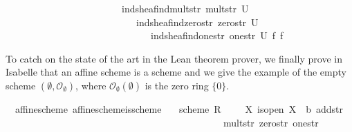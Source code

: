 \documentclass[12pt]{scrartcl}
\begin{document}
\begin{isabelle}
\ \ \ \ \ \ \ \ \ \ \ \ \ \ \ \ \ \ \ \ \ \ \ \ {\isacharparenleft}{\kern0pt}ind{\isacharunderscore}{\kern0pt}sheaf{\isachardot}{\kern0pt}ind{\isacharunderscore}{\kern0pt}mult{\isacharunderscore}{\kern0pt}str\ mult{\isacharunderscore}{\kern0pt}str\ U{\isacharparenright}{\kern0pt}\isanewline
\ \ \ \ \ \ \ \ \ \ \ \ \ \ \ \ \ \ \ \ \ \ \ \ \ \ \ {\isacharparenleft}{\kern0pt}ind{\isacharunderscore}{\kern0pt}sheaf{\isachardot}{\kern0pt}ind{\isacharunderscore}{\kern0pt}zero{\isacharunderscore}{\kern0pt}str\ zero{\isacharunderscore}{\kern0pt}str\ U{\isacharparenright}{\kern0pt}\ \isanewline
\ \ \ \ \ \ \ \ \ \ \ \ \ \ \ \ \ \ \ \ \ \ \ \ \ \ \ \ \ \ {\isacharparenleft}{\kern0pt}ind{\isacharunderscore}{\kern0pt}sheaf{\isachardot}{\kern0pt}ind{\isacharunderscore}{\kern0pt}one{\isacharunderscore}{\kern0pt}str\ one{\isacharunderscore}{\kern0pt}str\ U{\isacharparenright}{\kern0pt}\ f\ {\isasymphi}\isactrlsub f{\isacharparenright}{\kern0pt}{\isacharparenright}{\kern0pt}{\isachardoublequoteclose}
\end{isabelle}
To catch on the state of the art in the Lean theorem prover, we finally prove in Isabelle that an affine scheme is a scheme and we give the example of the empty scheme $(\emptyset, \mathscr{O}_\emptyset)$, where $\mathscr{O}_\emptyset(\emptyset)$ is the zero ring $\lbrace 0 \rbrace$. 

\begin{isabelle}
\isamarkupfalse%
\ {\isacharparenleft}{\kern0pt}\ affine{\isacharunderscore}{\kern0pt}scheme{\isacharparenright}{\kern0pt}\ affine{\isacharunderscore}{\kern0pt}scheme{\isacharunderscore}{\kern0pt}is{\isacharunderscore}{\kern0pt}scheme{\isacharcolon}{\kern0pt}\isanewline
\ \ \ {\isachardoublequoteopen}scheme\ R\ {\isacharparenleft}{\kern0pt}{\isacharplus}{\kern0pt}{\isacharparenright}{\kern0pt}\ {\isacharparenleft}{\kern0pt}{\isasymcdot}{\isacharparenright}{\kern0pt}\ {\isasymzero}\ {\isasymone}\ X\ is{\isacharunderscore}{\kern0pt}open\ {\isasymO}\isactrlsub X\ {\isasymrho}\ b\ add{\isacharunderscore}{\kern0pt}str\ \isanewline
\ \ \ \ \ \ \ \ \ \ \ \ \ \ \ \ \ \ \ \ \ \ \ \ \ \ \ \ \ \ \ \ \ \ \ \ \ \ \ \ \ \ \ \ \ mult{\isacharunderscore}{\kern0pt}str\ zero{\isacharunderscore}{\kern0pt}str\ one{\isacharunderscore}{\kern0pt}str{\isachardoublequoteclose}
\end{isabelle}
\end{document}
